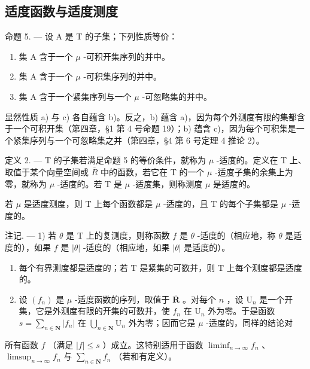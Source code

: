 \subsection{适度函数与适度测度}

命题 5. --- 设 A 是 T 的子集；下列性质等价：

\begin{enumerate}
\def\labelenumi{\alph{enumi})}
\item
  集 A 含于一个 \(\mu\) -可积开集序列的并中。
\item
  集 A 含于一个 \(\mu\) -可积集序列的并中。
\item
  集 A 含于一个紧集序列与一个 \(\mu\) -可忽略集的并中。
\end{enumerate}

显然性质 a) 与 c) 各自蕴含 b)。反之，b) 蕴含 a)，因为每个外测度有限的集都含于一个可积开集（第四章，§1 第 4 号命题 19）；b) 蕴含 c)，因为每个可积集是一个紧集序列与一个可忽略集之并（第四章，§4 第 6 号定理 4 推论 2）。

定义 2. --- T 的子集若满足命题 5 的等价条件，就称为 \(\mu\) -适度的。定义在 T 上、取值于某个向量空间或 \(\overline{R}\) 中的函数，若它在 T 的一个 \(\mu\) -适度子集的余集上为零，就称为 \(\mu\) -适度的。若 T 是 \(\mu\) -适度集，则称测度 \(\mu\) 是适度的。

若 \(\mu\) 是适度测度，则 T 上每个函数都是 \(\mu\) -适度的，且 T 的每个子集都是 \(\mu\) -适度的。

注记. --- 1) 若 \(\theta\) 是 T 上的复测度，则称函数 \(f\) 是 \(\theta\) -适度的（相应地，称 \(\theta\) 是适度的），如果 \(f\) 是 \(|\theta|\) -适度的（相应地，如果 \(|\theta|\) 是适度的）。

\begin{enumerate}
\def\labelenumi{\arabic{enumi})}
\setcounter{enumi}{1}
\item
  每个有界测度都是适度的；若 \(\mathrm{T}\) 是紧集的可数并，则 \(\mathrm{T}\) 上每个测度都是适度的。
\item
  设 \((f_n)\) 是 \(\mu\) -适度函数的序列，取值于 \(\overline{\mathbf{R}}\) 。对每个 \(n\) ，设 \(\mathrm{U}_n\) 是一个开集，它是外测度有限的开集的可数并，使 \(f_n\) 在 \(\mathrm{U}_n\) 外为零。于是函数 \(s = \sum_{n \in \mathbf{N}} |f_n|\) 在 \(\bigcup_{n\in \mathbf{N}}\mathrm{U}_n\) 外为零；因而它是 \(\mu\) -适度的，同样的结论对
\end{enumerate}

所有函数 \(f\) （满足 \(|f| \leqslant s\) ）成立。这特别适用于函数 \(\liminf_{n \to \infty} f_n\) 、\(\limsup_{n \to \infty} f_n\) 与 \(\sum_{n \in \mathbf{N}} f_n\) （若和有定义）。

